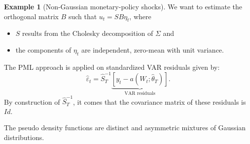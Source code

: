 \documentclass[
  12pt,
]{book}
\providecommand{\tightlist}{%
  \setlength{\itemsep}{0pt}\setlength{\parskip}{0pt}}
\theoremstyle{definition}
\theoremstyle{definition}
\newtheorem{example}{Example}[chapter]
\theoremstyle{definition}
\theoremstyle{definition}
\theoremstyle{remark}
\begin{document}
\begin{example}[Non-Gaussian monetary-policy shocks]
We want to estimate the orthogonal matrix \(B\) such that \(u_t=SB \eta_t\), where

\begin{itemize}
\tightlist
\item
  \(S\) results from the Cholesky decomposition of \(\Sigma\) and
\item
  the components of \(\eta_t\) are independent, zero-mean with unit variance.
\end{itemize}

The PML approach is applied on standardized VAR residuals given by:
\[
\hat\varepsilon_t = \hat{S}_T^{-1}\underbrace{[y_t - a(W_t;\hat\theta_T)]}_{\mbox{VAR residuals}}.
\]
By construction of \(\hat{S}_T^{-1}\), it comes that the covariance matrix of these residuals is \(Id\).

The pseudo density functions are distinct and asymmetric mixtures of Gaussian distributions.


\end{example}
\end{document}
